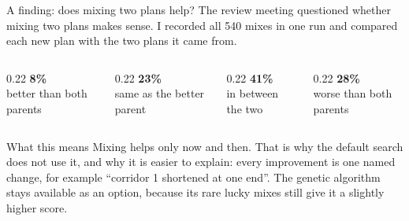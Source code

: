 \documentclass[9pt,aspectratio=169]{beamer}
\newcommand{\bignum}[2]{{\color{#1}\fontsize{30}{32}\selectfont\bfseries #2}}
\begin{document}
\begin{frame}{A finding: does mixing two plans help?}
The review meeting questioned whether mixing two plans makes sense. I recorded all 540 mixes in one run and compared each new plan with the two plans it came from.
\vspace{0.3cm}
\begin{columns}[T]
\begin{column}{0.22\textwidth}\centering
\bignum{ok}{8\%}\\ better than both parents
\end{column}
\begin{column}{0.22\textwidth}\centering
\bignum{blueprintdeep}{23\%}\\ same as the better parent
\end{column}
\begin{column}{0.22\textwidth}\centering
\bignum{blueprintdeep}{41\%}\\ in between the two
\end{column}
\begin{column}{0.22\textwidth}\centering
\bignum{critical}{28\%}\\ worse than both parents
\end{column}
\end{columns}
\vspace{0.5cm}
\begin{block}{What this means}
Mixing helps only now and then. That is why the default search does not use it, and why it is easier to explain: every improvement is one named change, for example ``corridor 1 shortened at one end''. The genetic algorithm stays available as an option, because its rare lucky mixes still give it a slightly higher score.
\end{block}
\end{frame}
\end{document}
